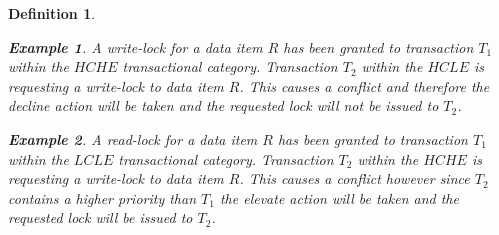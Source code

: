 \documentclass[conference]{IEEEtran}
\newtheorem{definition}{Definition}
\newtheorem{example}{Example}[definition]
\begin{document}
\begin{definition}

 
 \begin{example}
 \label{ex_decline_action}
  A write-lock for a data item $R$ has been granted to transaction $T_{1}$ within the $HCHE$ transactional category. Transaction $T_{2}$ within the $HCLE$ is requesting a write-lock to data item $R$. This causes a conflict and therefore the decline action will be taken and the requested lock will not be issued to $T_{2}$.
 \end{example}
 

 
 \begin{example}
 \label{ex_elevate_action}
  A read-lock for a data item $R$ has been granted to transaction $T_{1}$ within the $LCLE$ transactional category. Transaction $T_{2}$ within the $HCHE$ is requesting a write-lock to data item $R$. This causes a conflict however since $T_{2}$ contains a higher priority than $T_{1}$ the elevate action will be taken and the requested lock will be issued to $T_{2}$.
 \end{example}
 
\end{definition}
\end{document}
